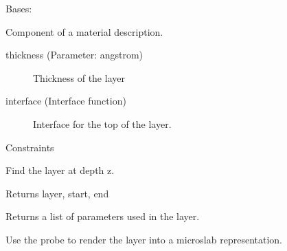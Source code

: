 \documentclass[letterpaper,10pt,english]{sphinxmanual}
\begin{document}
\begin{fulllineitems}
\label{api/model:refl1d.model.Layer}
Bases: 

Component of a material description.
\begin{description}
\item[{thickness (Parameter: angstrom)}] \leavevmode
Thickness of the layer

\item[{interface (Interface function)}] \leavevmode
Interface for the top of the layer.

\end{description}

\begin{fulllineitems}
\label{api/model:refl1d.model.Layer.constraints}
Constraints

\end{fulllineitems}


\begin{fulllineitems}
\label{api/model:refl1d.model.Layer.find}
Find the layer at depth z.

Returns layer, start, end

\end{fulllineitems}


\begin{fulllineitems}
\label{api/model:refl1d.model.Layer.parameters}
Returns a list of parameters used in the layer.

\end{fulllineitems}


\begin{fulllineitems}
\label{api/model:refl1d.model.Layer.render}
Use the probe to render the layer into a microslab representation.

\end{fulllineitems}


\end{fulllineitems}
\end{document}
